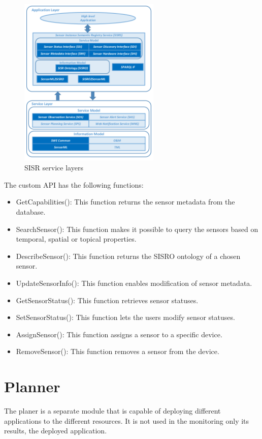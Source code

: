 \begin{figure}[h]
	\centering
	\includegraphics[width=0.6\textwidth]{figures/sisrserv.png}
	\caption{SISR service layers\label{fig:sisrserv}}
\end{figure}
The custom API has the following functions:
\begin{itemize}
\item GetCapabilities(): This function returns the sensor metadata from the database.
\item SearchSensor(): This function makes it possible to query the sensors based on temporal, spatial or topical properties.
\item DescribeSensor(): This function returns the SISRO ontology of a chosen sensor.
\item UpdateSensorInfo(): This function enables modification of sensor metadata.
\item GetSensorStatus(): This function retrieves sensor statuses.
\item SetSensorStatus(): This function lets the users modify sensor statuses.
\item AssignSensor(): This function assigns a sensor to a specific device.
\item RemoveSensor(): This function removes a sensor from the device.
\end{itemize}

\section{Planner}
The planer is a separate module that is capable of deploying different applications to the different resources. It is not used in the monitoring only its results, the deployed application.

